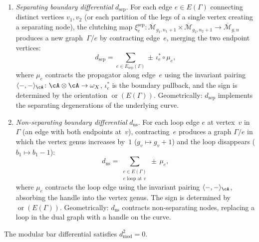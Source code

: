 \begin{definition}
\begin{enumerate}[label=\textup{(\roman*)}]
\item \emph{Separating boundary differential} $d_{\mathrm{sep}}$.
 For each edge $e \in E(\Gamma)$ connecting distinct vertices
 $v_1, v_2$ (or each partition of the legs of a single vertex
 creating a separating node), the clutching map
 $\xi_{e}^{\mathrm{sep}}\colon
 \overline{\mathcal{M}}_{g_1, n_1+1} \times
 \overline{\mathcal{M}}_{g_2, n_2+1} \to
 \overline{\mathcal{M}}_{g, n}$
 produces a new graph~$\Gamma/e$ by contracting edge~$e$,
 merging the two endpoint vertices:
 \begin{equation}\label{eq:d-sep}
 d_{\mathrm{sep}} = \sum_{e \in E_{\mathrm{sep}}(\Gamma)}
 \pm\, \iota_e^* \circ \mu_e,
 \end{equation}
 where $\mu_e$ contracts the propagator along edge~$e$ using the
 invariant pairing
 $\langle -, - \rangle_\cA\colon \cA \otimes \cA \to \omega_X$,
 $\iota_e^*$ is the boundary pullback, and the sign is determined
 by the orientation $\operatorname{or}(E(\Gamma))$.
 Geometrically: $d_{\mathrm{sep}}$ implements the separating
 degenerations of the underlying curve.

\item \emph{Non-separating boundary differential} $d_{\mathrm{ns}}$.
 For each loop edge $e$ at vertex~$v$ in~$\Gamma$
 (an edge with both endpoints at~$v$),
 contracting~$e$ produces a graph $\Gamma / e$ in which
 the vertex genus increases by~$1$ ($g_v \mapsto g_v + 1$)
 and the loop disappears ($b_1 \mapsto b_1 - 1$):
 \begin{equation}\label{eq:d-nonsep}
 d_{\mathrm{ns}} = \sum_{\substack{e \in E(\Gamma) \\
 e \text{ loop at } v}}
 \pm\, \mu_e,
 \end{equation}
 where $\mu_e$ contracts the loop edge using the invariant
 pairing $\langle -, - \rangle_\cA$, absorbing the handle
 into the vertex genus. The sign is determined by
 $\operatorname{or}(E(\Gamma))$.
 Geometrically: $d_{\mathrm{ns}}$ contracts non-separating
 nodes, replacing a loop in the dual graph with a handle on
 the curve.
\end{enumerate}
\end{definition}

\begin{proposition}[$d_{\mathrm{mod}}^2 = 0$;
\ClaimStatusConditional]\label{prop:d-mod-squared-zero}
The modular bar differential satisfies $d_{\mathrm{mod}}^2 = 0$.
\end{proposition}

